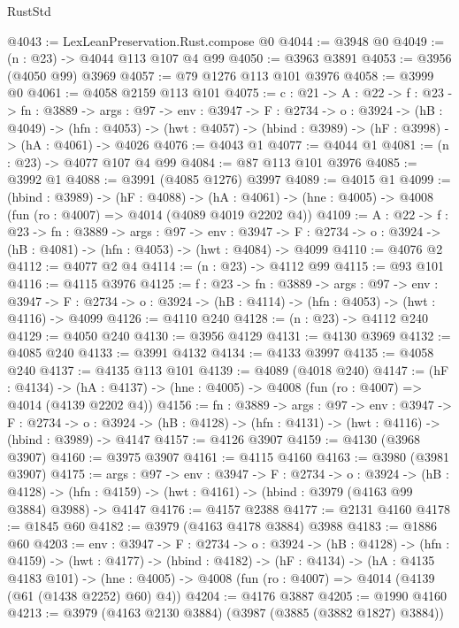 \begin{lexlean}{RustStd}
\begin{coremodule}
@4043 := LexLeanPreservation.Rust.compose @0
@4044 := @3948 @0
@4049 := (n : @23) -> @4044 @113 @107 @4 @99
@4050 := @3963 @3891
@4053 := @3956 (@4050 @99) @3969
@4057 := @79 @1276 @113 @101 @3976
@4058 := @3999 @0
@4061 := @4058 @2159 @113 @101
@4075 := {c : @21} ->
  {A : @22} ->
  {f : @23} ->
  {fn : @3889} ->
  {args : @97} ->
  {env : @3947} ->
  {F : @2734} ->
  {o : @3924} ->
  (hB : @4049) ->
  (hfn : @4053) -> (hwt : @4057) -> (hbind : @3989) -> (hF : @3998) -> (hA : @4061) -> @4026
@4076 := @4043 @1
@4077 := @4044 @1
@4081 := (n : @23) -> @4077 @107 @4 @99
@4084 := @87 @113 @101 @3976
@4085 := @3992 @1
@4088 := @3991 (@4085 @1276) @3997
@4089 := @4015 @1
@4099 := (hbind : @3989) ->
  (hF : @4088) ->
  (hA : @4061) -> (hne : @4005) -> @4008 (fun (ro : @4007) => @4014 (@4089 @4019 @2202 @4))
@4109 := {A : @22} ->
  {f : @23} ->
  {fn : @3889} ->
  {args : @97} ->
  {env : @3947} ->
  {F : @2734} -> {o : @3924} -> (hB : @4081) -> (hfn : @4053) -> (hwt : @4084) -> @4099
@4110 := @4076 @2
@4112 := @4077 @2 @4
@4114 := (n : @23) -> @4112 @99
@4115 := @93 @101
@4116 := @4115 @3976
@4125 := {f : @23} ->
  {fn : @3889} ->
  {args : @97} ->
  {env : @3947} ->
  {F : @2734} -> {o : @3924} -> (hB : @4114) -> (hfn : @4053) -> (hwt : @4116) -> @4099
@4126 := @4110 @240
@4128 := (n : @23) -> @4112 @240
@4129 := @4050 @240
@4130 := @3956 @4129
@4131 := @4130 @3969
@4132 := @4085 @240
@4133 := @3991 @4132
@4134 := @4133 @3997
@4135 := @4058 @240
@4137 := @4135 @113 @101
@4139 := @4089 (@4018 @240)
@4147 := (hF : @4134) ->
  (hA : @4137) -> (hne : @4005) -> @4008 (fun (ro : @4007) => @4014 (@4139 @2202 @4))
@4156 := {fn : @3889} ->
  {args : @97} ->
  {env : @3947} ->
  {F : @2734} ->
  {o : @3924} -> (hB : @4128) -> (hfn : @4131) -> (hwt : @4116) -> (hbind : @3989) -> @4147
@4157 := @4126 @3907
@4159 := @4130 (@3968 @3907)
@4160 := @3975 @3907
@4161 := @4115 @4160
@4163 := @3980 (@3981 @3907)
@4175 := {args : @97} ->
  {env : @3947} ->
  {F : @2734} ->
  {o : @3924} ->
  (hB : @4128) -> (hfn : @4159) -> (hwt : @4161) -> (hbind : @3979 (@4163 @99 @3884) @3988) -> @4147
@4176 := @4157 @2388
@4177 := @2131 @4160
@4178 := @1845 @60
@4182 := @3979 (@4163 @4178 @3884) @3988
@4183 := @1886 @60
@4203 := {env : @3947} ->
  {F : @2734} ->
  {o : @3924} ->
  (hB : @4128) ->
  (hfn : @4159) ->
  (hwt : @4177) ->
  (hbind : @4182) ->
  (hF : @4134) ->
  (hA : @4135 @4183 @101) ->
  (hne : @4005) -> @4008 (fun (ro : @4007) => @4014 (@4139 (@61 (@1438 @2252) @60) @4))
@4204 := @4176 @3887
@4205 := @1990 @4160
@4213 := @3979 (@4163 @2130 @3884) (@3987 (@3885 (@3882 @1827) @3884))

\end{coremodule}
\end{lexlean}
